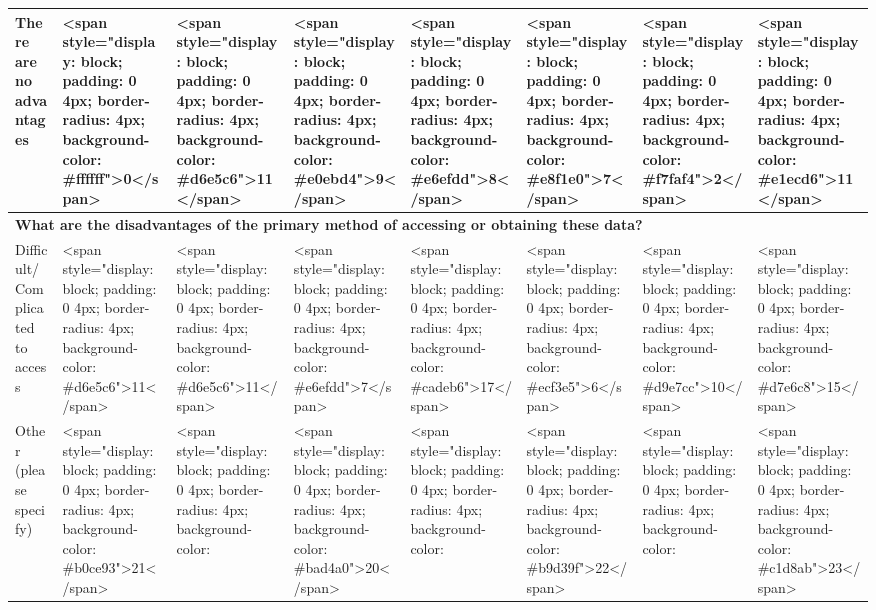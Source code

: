 \documentclass[
]{article}
\begin{document}
\begin{table}
\begin{tabular}[t]{l|l|l|l|l|l|l|l}
\hspace{1em}There are no advantages & <span style="display: block; padding: 0 4px; border-radius: 4px; background-color: #ffffff">0</span> & <span style="display: block; padding: 0 4px; border-radius: 4px; background-color: #d6e5c6">11</span> & <span style="display: block; padding: 0 4px; border-radius: 4px; background-color: #e0ebd4">9</span> & <span style="display: block; padding: 0 4px; border-radius: 4px; background-color: #e6efdd">8</span> & <span style="display: block; padding: 0 4px; border-radius: 4px; background-color: #e8f1e0">7</span> & <span style="display: block; padding: 0 4px; border-radius: 4px; background-color: #f7faf4">2</span> & <span style="display: block; padding: 0 4px; border-radius: 4px; background-color: #e1ecd6">11</span>\\
\hline
\multicolumn{8}{l}{\textbf{What are the disadvantages of the primary method of accessing or obtaining these data?}}\\
\hline
\hspace{1em}Difficult/Complicated to access & <span style="display: block; padding: 0 4px; border-radius: 4px; background-color: #d6e5c6">11</span> & <span style="display: block; padding: 0 4px; border-radius: 4px; background-color: #d6e5c6">11</span> & <span style="display: block; padding: 0 4px; border-radius: 4px; background-color: #e6efdd">7</span> & <span style="display: block; padding: 0 4px; border-radius: 4px; background-color: #cadeb6">17</span> & <span style="display: block; padding: 0 4px; border-radius: 4px; background-color: #ecf3e5">6</span> & <span style="display: block; padding: 0 4px; border-radius: 4px; background-color: #d9e7cc">10</span> & <span style="display: block; padding: 0 4px; border-radius: 4px; background-color: #d7e6c8">15</span>\\
\hline
\hspace{1em}Other (please specify) & <span style="display: block; padding: 0 4px; border-radius: 4px; background-color: #b0ce93">21</span> & <span style="display: block; padding: 0 4px; border-radius: 4px; background-color: #84b256">33</span> & <span style="display: block; padding: 0 4px; border-radius: 4px; background-color: #bad4a0">20</span> & <span style="display: block; padding: 0 4px; border-radius: 4px; background-color: #98bf72">33</span> & <span style="display: block; padding: 0 4px; border-radius: 4px; background-color: #b9d39f">22</span> & <span style="display: block; padding: 0 4px; border-radius: 4px; background-color: #93bb6b">29</span> & <span style="display: block; padding: 0 4px; border-radius: 4px; background-color: #c1d8ab">23</span>\\

\end{tabular}
\end{table}
\end{document}
